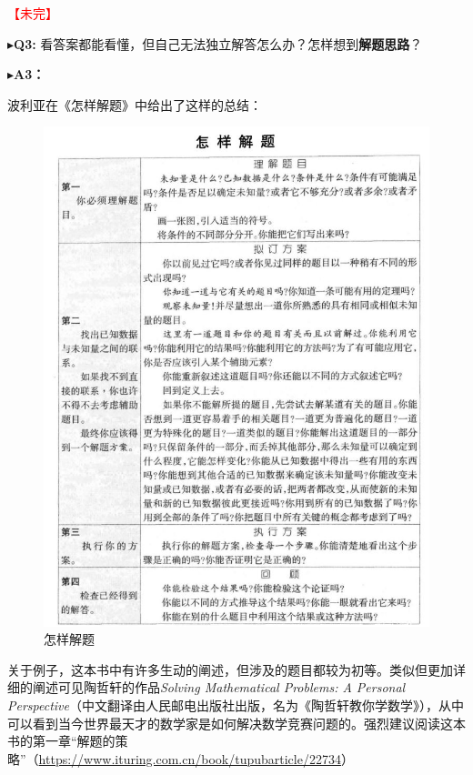 \documentclass{ctexart}
\begin{document}
\textcolor{red}{【未完】}

\noindent$\blacktriangleright$\;\textbf{Q3:} 看答案都能看懂，但自己无法独立解答怎么办？怎样想到\textbf{解题思路}？

\noindent$\blacktriangleright$\;\textbf{A3：}

波利亚在《怎样解题》中给出了这样的总结：

\begin{figure}[htbp]
  \centering
  \includegraphics[width=.9\linewidth]{fig/怎样解题.JPG}
  \caption{怎样解题}
  \label{fig:polya}
\end{figure}

关于例子，这本书中有许多生动的阐述，但涉及的题目都较为初等。类似但更加详细的阐述可见陶哲轩的作品\textit{Solving Mathematical Problems: A Personal Perspective}（中文翻译由人民邮电出版社出版，名为《陶哲轩教你学数学》），从中可以看到当今世界最天才的数学家是如何解决数学竞赛问题的。强烈建议阅读这本书的第一章“解题的策略”（\url{https://www.ituring.com.cn/book/tupubarticle/22734}）
\end{document}
